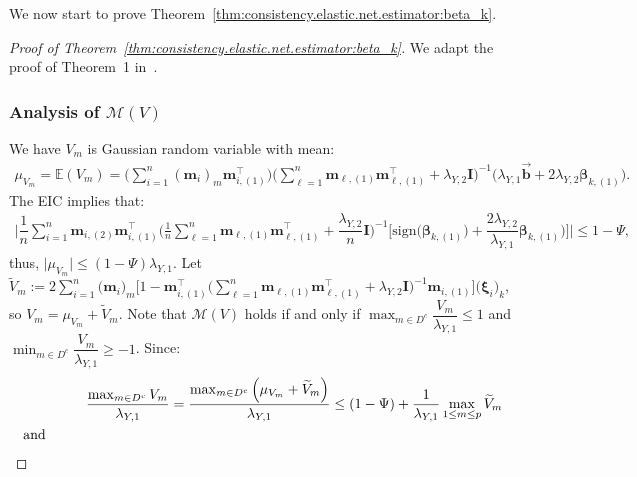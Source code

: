 \documentclass[
  12pt]{article}
\def\M{\mathbf{m}}
\begin{document}
We now start to prove Theorem~\ref{thm:consistency.elastic.net.estimator:beta_k}. 
\begin{proof}[Proof of Theorem~\ref{thm:consistency.elastic.net.estimator:beta_k}]
We adapt the proof of Theorem~1 in~\cite{Jia-Yu:2010:model.consistency.elastic-net}.
	\subsubsection*{Analysis of $\mathcal{M}(V)$}
	We have $V_{m}$ is Gaussian random variable with mean:
	\begin{align*}
		\mu_{V_m} =  \mathbb{E}(V_{m} )  =  \Big(  \sum_{i = 1}^{n} (\M_{i})_{m}  \M_{i,(1)}^{\top}    \Big)  
		\Big( \sum_{\ell = 1}^{n}  \M_{\ell,(1)} \M_{\ell,(1)}^{\top}  + \lambda_{Y,2} \mathbf{I} \Big)^{-1} \Big( \lambda_{Y,1} \overrightarrow{\mathbf{b}}  +  2 \lambda_{Y,2} \bm{\beta}_{k , (1)}   \Big) .
	\end{align*}
	The EIC implies that:
	\begin{align*}  
		\Big| \dfrac{1}{n}  \sum_{i=1}^{n}  \M_{i,(2)} \M_{i,(1)}^{\top}   \Big( \frac{1}{n} \sum_{\ell = 1}^{n}  \M_{\ell,(1)}    \M_{\ell,(1)}^{\top}  +  \dfrac{\lambda_{Y,2}}{n} \mathbf{I}  \Big)^{-1}  \Big[ \textrm{sign} \big( \bm{\beta}_{k , (1)} \big)  +  \dfrac{2 \lambda_{Y,2}}{ \lambda_{Y,1} } \bm{\beta}_{k , (1)}  \big) \Big]    
		\Big|  \leq  1 - \Psi ,     
	\end{align*}
	thus, $\big| \mu_{V_m} \big|  \leq  (1 - \Psi) \lambda_{Y,1}$. 
	Let $\widetilde{V}_{m} :=  2 \sum_{i=1}^{n} \big( \M_{i} \big)_{m} \Big[ 1 - \M_{i,(1)}^{\top} \Big(  \sum_{\ell = 1}^{n}   \M_{\ell,(1)} \M_{\ell,(1)}^{\top}  +  \lambda_{Y,2} \mathbf I \Big)^{-1} \M_{i,(1)}  \Big]  \big( \bm{\xi}_{i}  \big)_{k} $,  
	so $V_{m} = \mu_{V_m} + \widetilde{V}_{m}$. Note that  $\mathcal{M}(V)$ holds if and only if  $\displaystyle{ \max_{m \in D^{c}} } \dfrac{V_{m}}{\lambda_{Y,1}}  \leq  1 $ and  $\displaystyle{ \min_{m \in  D^{c} } }  \dfrac{V_{m}}{\lambda_{Y,1}}  \geq  -1 $. Since:    
	\begin{align*}  
		\dfrac{\max_{m \in D^{c}} V_{m} }{\lambda_{Y,1}}  &=    \dfrac{ \max_{m \in D^{c}} \Big( \mu_{V_m} + \widetilde{V}_{m} \Big) }{\lambda_{Y,1}}  \leq  (1-\Psi) + \dfrac{1}{\lambda_{Y,1}}  \max_{1 \leq m \leq p} \widetilde{V}_{m}  
		\\
		\textrm{ and }   \hspace*{3cm}   &   
		\\

\end{align*}
\end{proof}
\end{document}
